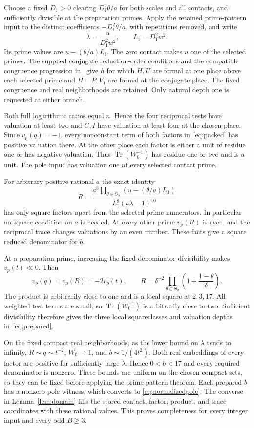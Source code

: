 \documentclass[11pt,a4paper]{article}
\DeclareMathOperator{\Tr}{Tr}\DeclareMathOperator{\Nm}{N}
\begin{document}
Choose a fixed $D_1>0$ clearing $D_1^2\theta/a$ for both scales and
all contacts, and sufficiently divisible at the preparation primes.
Apply the retained prime-pattern input to the distinct coefficients
$-D_1^2\theta/a$, with repetitions removed, and write
\[
                \lambda=\frac{u}{D_1^2w^2},\qquad L_1=D_1^2w^2.
\]
Its prime values are $u-(\theta/a)L_1$. The zero contact makes $u$
one of the selected primes. The supplied conjugate reduction-order
conditions and the compatible congruence progression in~\cite{Dependencies}
give $h$ for which $H,U$ are formal at one place above each selected
prime and $H-P,V_1$ are formal at the conjugate place. The fixed
congruence and real neighborhoods are retained. Only natural depth one
is requested at either branch.

Both full logarithmic ratios equal $n$. Hence the four reciprocal
tests have valuation at least two and $C,I$ have valuation at least
four at the chosen place. Since $v_p(q)=-1$, every nonconstant term
of both factors in~\eqref{eq:packed} has positive valuation there.
At the other place each factor is either a unit of residue one or has
negative valuation. Thus $\Tr(W_0^{-1})$ has residue one or two and is
a unit. The pole input has valuation one at every selected contact prime.

For arbitrary positive rational $a$ the exact identity
\begin{equation}\label{eq:primeproduct}
 R=\frac{a^8\prod_{\theta\in\Theta_8}(u-(\theta/a)L_1)}
             {L_1^8(a\lambda-1)^{10}}
\end{equation}
has only square factors apart from the selected prime numerators.
In particular no square condition on $a$ is needed. At every other
prime $v_p(R)$ is even, and the reciprocal trace changes valuations
by an even number. These facts give a square reduced denominator for $b$.

At a preparation prime, increasing the fixed denominator divisibility
makes $v_p(t)\ll0$. Then
\[
 v_p(q)=v_p(R)=-2v_p(t),\qquad
 R=\delta^{-2}\prod_{\theta\in\Theta_8}
                   \left(1+\frac{1-\theta}{\delta}\right).
\]
The product is arbitrarily close to one and is a local square at
$2,3,17$. All weighted test terms are small, so $\Tr(W_0^{-1})$ is
arbitrarily close to two. Sufficient divisibility therefore gives the
three local squareclasses and valuation depths in~\eqref{eq:prepared}.

On the fixed compact real neighborhoods, as the lower bound on $\lambda$
tends to infinity, $R\sim q\sim t^{-2}$, $W_0\to1$, and
$b\sim1/(4t^2)$. Both real embeddings of every factor are positive
for sufficiently large $\lambda$. Hence $0<b<17$ and every required
denominator is nonzero. These bounds are uniform on the chosen compact
sets, so they can be fixed before applying the prime-pattern theorem.
Each prepared $b$ has a nonzero pole witness, which converts to
\eqref{eq:normalizedpole}. The converse in Lemma~\ref{lem:domain} fills the stored contact,
factor, product, and trace coordinates with these rational values. This proves completeness for every
integer input and every odd $B\ge3$.
\end{document}
